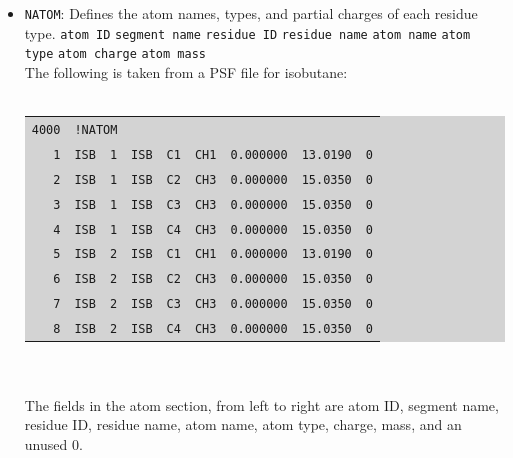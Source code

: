 \begin{itemize}
\item \texttt{NATOM}: Defines the atom names, types, and partial charges of each residue type.
	\subitem \texttt{atom ID}
	\subitem \texttt{segment name} 
	\subitem \texttt{residue ID}
	\subitem \texttt{residue name}
	\subitem \texttt{atom name}
	\subitem \texttt{atom type}
	\subitem \texttt{atom charge}
	\subitem \texttt{atom mass} \\
	The following is taken from a PSF file for isobutane: \\\\
	\colorbox{lightgray}{
\begin{tabular}{r l l l l l l l l}
\texttt{4000} & \multicolumn{8}{l}{\texttt{!NATOM}}\\
\texttt{1} & \texttt{ISB} & \texttt{1} & \texttt{ISB} & \texttt{C1} & \texttt{CH1} & \texttt{0.000000} & \texttt{13.0190} & \texttt{0}\\
\texttt{2} & \texttt{ISB} & \texttt{1} & \texttt{ISB} & \texttt{C2} & \texttt{CH3} & \texttt{0.000000} & \texttt{15.0350} & \texttt{0}\\
\texttt{3} & \texttt{ISB} & \texttt{1} & \texttt{ISB} & \texttt{C3} & \texttt{CH3} & \texttt{0.000000} & \texttt{15.0350} & \texttt{0}\\
\texttt{4} & \texttt{ISB} & \texttt{1} & \texttt{ISB} & \texttt{C4} & \texttt{CH3} & \texttt{0.000000} & \texttt{15.0350} & \texttt{0}\\
\texttt{5} & \texttt{ISB} & \texttt{2} & \texttt{ISB} & \texttt{C1} & \texttt{CH1} & \texttt{0.000000} & \texttt{13.0190} & \texttt{0}\\
\texttt{6} & \texttt{ISB} & \texttt{2} & \texttt{ISB} & \texttt{C2} & \texttt{CH3} & \texttt{0.000000} & \texttt{15.0350} & \texttt{0}\\
\texttt{7} & \texttt{ISB} & \texttt{2} & \texttt{ISB} & \texttt{C3} & \texttt{CH3} & \texttt{0.000000} & \texttt{15.0350} & \texttt{0}\\
\texttt{8} & \texttt{ISB} & \texttt{2} & \texttt{ISB} & \texttt{C4} & \texttt{CH3} & \texttt{0.000000} & \texttt{15.0350} & \texttt{0}
\end{tabular}
}\\\\
The fields in the atom section, from left to right are atom ID, segment name, residue ID, residue name, atom name, atom type, charge, mass, and an unused 0. \\
	

\end{itemize}
